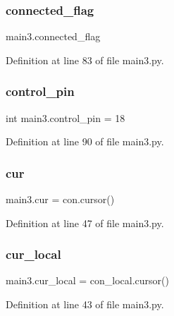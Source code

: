 \subsubsection{\texorpdfstring{connected\+\_\+flag}{connected\_flag}}
{\footnotesize\ttfamily main3.\+connected\+\_\+flag}



Definition at line 83 of file main3.\+py.

\mbox{\label{namespacemain3_a71b20202aeb60b168b1dcee86f9d0d2a}} 
\subsubsection{\texorpdfstring{control\+\_\+pin}{control\_pin}}
{\footnotesize\ttfamily int main3.\+control\+\_\+pin = 18}



Definition at line 90 of file main3.\+py.

\mbox{\label{namespacemain3_a4a9cd088c1387b19bfaa89ed31b577c2}} 
\subsubsection{\texorpdfstring{cur}{cur}}
{\footnotesize\ttfamily main3.\+cur = con.\+cursor()}



Definition at line 47 of file main3.\+py.

\mbox{\label{namespacemain3_a25fd8974a655b4dc7bed362d3406bec3}} 
\subsubsection{\texorpdfstring{cur\+\_\+local}{cur\_local}}
{\footnotesize\ttfamily main3.\+cur\+\_\+local = con\+\_\+local.\+cursor()}



Definition at line 43 of file main3.\+py.

\mbox{\label{namespacemain3_aac45a371e86ea7af1ea340ec4e0f95a9}} 
